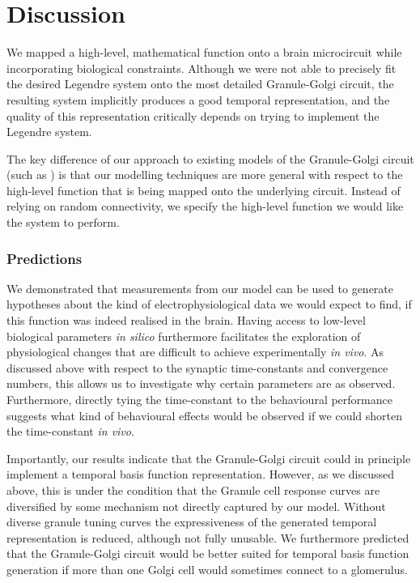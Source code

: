 
\section{Discussion}

We mapped a high-level, mathematical function onto a brain microcircuit while incorporating biological constraints.
Although we were not able to precisely fit the desired Legendre system onto the most detailed Granule-Golgi circuit, the resulting system implicitly produces a good temporal representation, and the quality of this representation critically depends on trying to implement the Legendre system.

The key difference of our approach to existing models of the Granule-Golgi circuit (such as \cite{rossert2015edge}) is that our modelling techniques are more general with respect to the high-level function that is being mapped onto the underlying circuit.
Instead of relying on random connectivity, we specify the high-level function we would like the system to perform.

\subsubsection{Predictions}
We demonstrated that measurements from our model can be used to generate hypotheses about the kind of electrophysiological data we would expect to find, if this function was indeed realised in the brain.
Having access to low-level biological parameters \emph{in silico} furthermore facilitates the exploration of physiological changes that are difficult to achieve experimentally \emph{in vivo}.
As discussed above with respect to the synaptic time-constants and convergence numbers, this allows us to investigate why certain parameters are as observed.
Furthermore, directly tying the time-constant to the behavioural performance suggests what kind of behavioural effects would be observed if we could shorten the time-constant \emph{in vivo}.

Importantly, our results indicate that the Granule-Golgi circuit could in principle implement a temporal basis function representation.
However, as we discussed above, this is under the condition that the Granule cell response curves are diversified by some mechanism not directly captured by our model.
Without diverse granule tuning curves the expressiveness of the generated temporal representation is reduced, although not fully unusable.
We furthermore predicted that the Granule-Golgi circuit would be better suited for temporal basis function generation if more than one Golgi cell would sometimes connect to a glomerulus.

